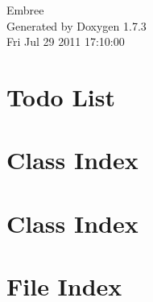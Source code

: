 \documentclass[a4paper]{book}
\begin{document}
\hypersetup{pageanchor=false}
\begin{titlepage}
\vspace*{7cm}
\begin{center}
{\Large Embree }\\
\vspace*{1cm}
{\large Generated by Doxygen 1.7.3}\\
\vspace*{0.5cm}
{\small Fri Jul 29 2011 17:10:00}\\
\end{center}
\end{titlepage}
\clearemptydoublepage
{}
\tableofcontents
\clearemptydoublepage
{}
\hypersetup{pageanchor=true}
\chapter{Todo List}
\label{todo}
\hypertarget{todo}{}

\chapter{Class Index}

\chapter{Class Index}

\chapter{File Index}

\end{document}
